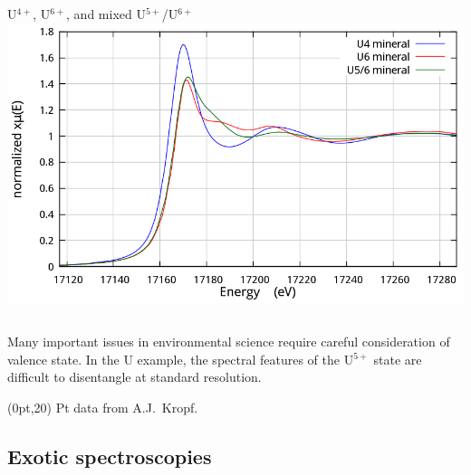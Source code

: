 \documentclass[10pt, xcolor=x11names, compress]{beamer}
\begin{document}
\begin{frame}
\begin{columns}
\begin{column}{0.4\linewidth}
\begin{center}
        U$^{4+}$, U$^{6+}$, and mixed U$^{5+}$/U$^{6+}$
        \includegraphics[width=0.95\linewidth]{pses/hires/u456.png}
      \end{center}
    \end{column}
  \end{columns}

  \medskip

  \small
  Many important issues in environmental science require careful
  consideration of valence state.  In the U example, the spectral
  features of the U$^{5+}$ state are difficult to disentangle at
  standard resolution.
  \begin{textblock*}{0.6\linewidth}(0pt,20\TPVertModule) \tiny
    Pt data from A.J.\ Kropf.
  \end{textblock*}
\end{frame}

\subsection[Exotic spectroscopies]{Exotic spectroscopies}
\end{document}
